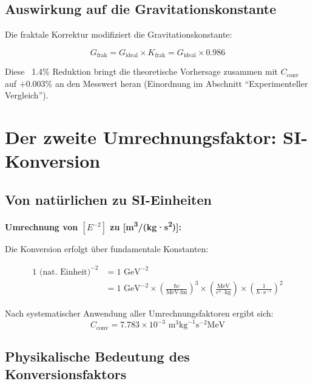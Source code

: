 	\subsection{Auswirkung auf die Gravitationskonstante}
	
	Die fraktale Korrektur modifiziert die Gravitationskonstante:
	
	\begin{equation}
		G_{\text{frak}} = G_{\text{ideal}} \times K_{\text{frak}} = G_{\text{ideal}} \times 0.986
	\end{equation}
	
	Diese ~1.4\% Reduktion bringt die theoretische Vorhersage zusammen mit $C_{\text{conv}}$ auf $+0.003\%$ an den Messwert heran (Einordnung im Abschnitt \enquote{Experimenteller Vergleich}).
	
	\section{Der zweite Umrechnungsfaktor: SI-Konversion}
	
	\subsection{Von natürlichen zu SI-Einheiten}
	
	\begin{dimensional}
		\textbf{Umrechnung von $[E^{-2}]$ zu [m\textsuperscript{3}/(kg·s\textsuperscript{2})]:}
		
		Die Konversion erfolgt über fundamentale Konstanten:
		
		\begin{align}
			1 \text{ (nat. Einheit)}^{-2} &= 1 \text{ GeV}^{-2} \\
			&= 1 \text{ GeV}^{-2} \times \left(\frac{\hbar c}{\text{MeV·fm}}\right)^3 \times \left(\frac{\text{MeV}}{c^2 \cdot \text{kg}}\right) \times \left(\frac{1}{\hbar \cdot \text{s}^{-1}}\right)^2
		\end{align}
		
		Nach systematischer Anwendung aller Umrechnungsfaktoren ergibt sich:
		\begin{equation}
			C_{\text{conv}} = 7.783 \times 10^{-3} \text{ m}^3\text{kg}^{-1}\text{s}^{-2}\text{MeV}
		\end{equation}
	\end{dimensional}
	
	\subsection{Physikalische Bedeutung des Konversionsfaktors}
	
